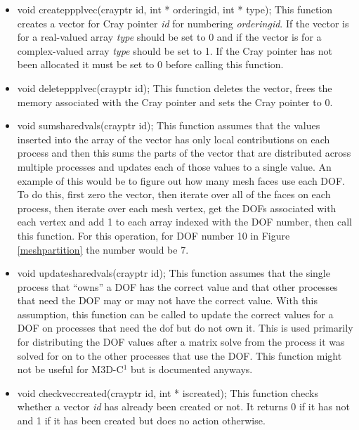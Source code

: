 \begin{itemize}
\item   void createppplvec(crayptr id, int * orderingid, int * type); This function creates a vector for Cray pointer
\textit{id} for numbering \textit{orderingid}. If the vector is for a real-valued array \textit{type}
should be set to 0 and if the vector is for  a complex-valued array \textit{type} should be set to 1. 
 If the Cray pointer has not been allocated it
must be set to 0 before calling this function.
\item   void deleteppplvec(crayptr id); This function deletes the vector, frees the memory associated 
with the Cray pointer and sets the Cray pointer to 0.
\item   void sumsharedvals(crayptr id);  This function assumes that the values inserted into the
array of the vector has only local contributions on each process and then this sums the parts
of the vector that are distributed across multiple processes and updates each of those values
to a single value.  An example of this would be to figure out how many mesh faces use each DOF.  To do this, 
first zero the vector, then 
iterate over all of the faces on each process, then iterate over each mesh vertex, get the DOFs
associated with each vertex and add 1 to each array indexed with the DOF number, then call this function.
For this operation, for DOF number 10 in Figure \ref{meshpartition} the number would be 7.
\item   void updatesharedvals(crayptr id);  This function assumes that the single process that ``owns'' a DOF
has the correct value and that other processes that need the DOF may or may not have the correct value.  With
this assumption, this function can be called to update the correct values for a DOF on processes
that need the dof but do not own it.  This is used primarily for distributing the DOF values after a matrix solve
from the process it was solved for on to the other processes that use the DOF.  This function might not be useful
for M3D-C$^1$ but is documented anyways.
\item   void checkveccreated(crayptr id, int * iscreated); This function checks whether a vector \textit{id} 
has already been created or not.  It returns 0 if it has not and 1 if it has been created but does no
action otherwise.  
\end{itemize}

